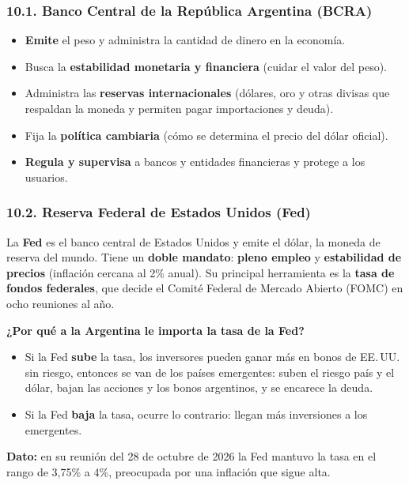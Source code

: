 \subsubsection*{10.1. Banco Central de la República Argentina (BCRA)}
\begin{itemize}
  \item \textbf{Emite} el peso y administra la cantidad de dinero en la economía.
  \item Busca la \textbf{estabilidad monetaria y financiera} (cuidar el valor del peso).
  \item Administra las \textbf{reservas internacionales} (dólares, oro y otras divisas que
        respaldan la moneda y permiten pagar importaciones y deuda).
  \item Fija la \textbf{política cambiaria} (cómo se determina el precio del dólar oficial).
  \item \textbf{Regula y supervisa} a bancos y entidades financieras y protege a los usuarios.
\end{itemize}

\subsubsection*{10.2. Reserva Federal de Estados Unidos (Fed)}
La \textbf{Fed} es el banco central de Estados Unidos y emite el dólar, la moneda de reserva
del mundo. Tiene un \textbf{doble mandato}: \textbf{pleno empleo} y \textbf{estabilidad de
precios} (inflación cercana al 2\% anual). Su principal herramienta es la \textbf{tasa de
fondos federales}, que decide el Comité Federal de Mercado Abierto (FOMC) en ocho reuniones al
año.

\begin{recuadro}
\textbf{¿Por qué a la Argentina le importa la tasa de la Fed?}
\begin{itemize}[leftmargin=*,nosep]
  \item Si la Fed \textbf{sube} la tasa, los inversores pueden ganar más en bonos de EE.\,UU.
        sin riesgo, entonces se van de los países emergentes: suben el riesgo país y el dólar,
        bajan las acciones y los bonos argentinos, y se encarece la deuda.
  \item Si la Fed \textbf{baja} la tasa, ocurre lo contrario: llegan más inversiones a los
        emergentes.
\end{itemize}
\textbf{Dato:} en su reunión del 28 de octubre de 2026 la Fed mantuvo la tasa en el rango de
3,75\% a 4\%, preocupada por una inflación que sigue alta.
\end{recuadro}

